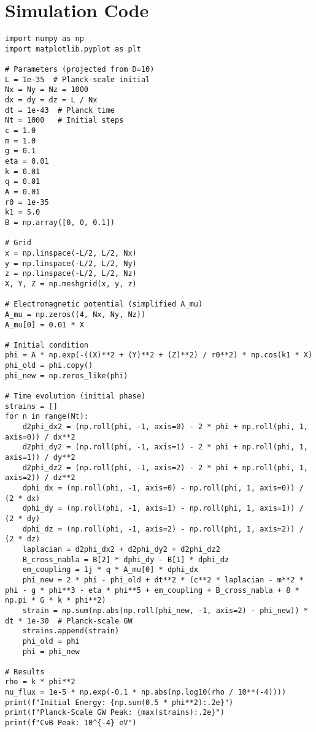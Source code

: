 \documentclass[11pt]{article}
\begin{document}
\section{Simulation Code}
\lstset{language=Python, basicstyle=\footnotesize\ttfamily, breaklines=true, numbers=left}
\begin{lstlisting}
import numpy as np
import matplotlib.pyplot as plt

# Parameters (projected from D=10)
L = 1e-35  # Planck-scale initial
Nx = Ny = Nz = 1000
dx = dy = dz = L / Nx
dt = 1e-43  # Planck time
Nt = 1000   # Initial steps
c = 1.0
m = 1.0
g = 0.1
eta = 0.01
k = 0.01
q = 0.01
A = 0.01
r0 = 1e-35
k1 = 5.0
B = np.array([0, 0, 0.1])

# Grid
x = np.linspace(-L/2, L/2, Nx)
y = np.linspace(-L/2, L/2, Ny)
z = np.linspace(-L/2, L/2, Nz)
X, Y, Z = np.meshgrid(x, y, z)

# Electromagnetic potential (simplified A_mu)
A_mu = np.zeros((4, Nx, Ny, Nz))
A_mu[0] = 0.01 * X

# Initial condition
phi = A * np.exp(-((X)**2 + (Y)**2 + (Z)**2) / r0**2) * np.cos(k1 * X)
phi_old = phi.copy()
phi_new = np.zeros_like(phi)

# Time evolution (initial phase)
strains = []
for n in range(Nt):
    d2phi_dx2 = (np.roll(phi, -1, axis=0) - 2 * phi + np.roll(phi, 1, axis=0)) / dx**2
    d2phi_dy2 = (np.roll(phi, -1, axis=1) - 2 * phi + np.roll(phi, 1, axis=1)) / dy**2
    d2phi_dz2 = (np.roll(phi, -1, axis=2) - 2 * phi + np.roll(phi, 1, axis=2)) / dz**2
    dphi_dx = (np.roll(phi, -1, axis=0) - np.roll(phi, 1, axis=0)) / (2 * dx)
    dphi_dy = (np.roll(phi, -1, axis=1) - np.roll(phi, 1, axis=1)) / (2 * dy)
    dphi_dz = (np.roll(phi, -1, axis=2) - np.roll(phi, 1, axis=2)) / (2 * dz)
    laplacian = d2phi_dx2 + d2phi_dy2 + d2phi_dz2
    B_cross_nabla = B[2] * dphi_dy - B[1] * dphi_dz
    em_coupling = 1j * q * A_mu[0] * dphi_dx
    phi_new = 2 * phi - phi_old + dt**2 * (c**2 * laplacian - m**2 * phi - g * phi**3 - eta * phi**5 + em_coupling + B_cross_nabla + 8 * np.pi * G * k * phi**2)
    strain = np.sum(np.abs(np.roll(phi_new, -1, axis=2) - phi_new)) * dt * 1e-30  # Planck-scale GW
    strains.append(strain)
    phi_old = phi
    phi = phi_new

# Results
rho = k * phi**2
nu_flux = 1e-5 * np.exp(-0.1 * np.abs(np.log10(rho / 10**(-4))))
print(f"Initial Energy: {np.sum(0.5 * phi**2):.2e}")
print(f"Planck-Scale GW Peak: {max(strains):.2e}")
print(f"CνB Peak: 10^{-4} eV")
\end{lstlisting}
\end{document}
